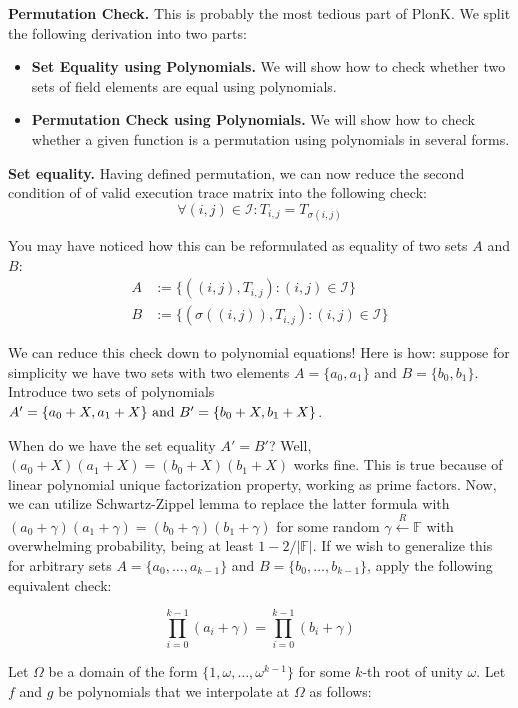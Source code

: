 \documentclass[../lecture-notes.tex]{subfiles}
\begin{document}
\textcolor{green!60!black}{\textbf{Permutation Check.}} This is probably the most
tedious part of PlonK. We split the following derivation into two parts:
\begin{itemize}
    \item \textbf{Set Equality using Polynomials.} We will show how to check
    whether two sets of field elements are equal using polynomials.
    \item \textbf{Permutation Check using Polynomials.} We will show how to
    check whether a given function is a permutation using polynomials in several 
    forms.
\end{itemize}

\textbf{Set equality.} Having defined permutation, we can now reduce the second
condition of  of valid execution trace matrix into
the following check:
\[\forall (i, j) \in \mathcal{I}: T_{i,j} = T_{\sigma(i,j)}\]

You may have noticed how this can be reformulated as equality of two sets $A$ and $B$:
\begin{align*}
    A &:= \{((i, j), T_{i,j}) : (i, j) \in \mathcal{I}\} \\
    B &:= \{(\sigma((i, j)), T_{i,j}) : (i, j) \in \mathcal{I}\}
\end{align*}

We can reduce this check down to polynomial equations! Here is how: suppose for
simplicity we have two sets with two elements \(A = \{a_0, a_1\}\) and \(B =
\{b_0, b_1\}\). Introduce two sets of polynomials \(A' = \{a_0 + X, a_1 +
X\}$ and $B' = \{b_0 + X, b_1 + X\}\). 

When do we have the set equality \(A' = B'\)? Well, \((a_0 + X)(a_1 + X) = (b_0
+ X)(b_1 + X)\) works fine. This is true because of linear polynomial unique
factorization property, working as prime factors. Now, we can utilize
Schwartz-Zippel lemma to replace the latter formula with \((a_0 + \gamma)(a_1 +
\gamma) = (b_0 + \gamma)(b_1 + \gamma)\) for some random $\gamma \xleftarrow{R}
\mathbb{F}$ with overwhelming probability, being at least $1-2/|\mathbb{F}|$. If we
wish to generalize this for arbitrary sets \(A = \{a_0, \ldots, a_{k-1}\}\) and
\(B = \{b_0, \ldots, b_{k-1}\}\), apply the following equivalent check:

\[\prod_{i=0}^{k-1} (a_i + \gamma) = \prod_{i=0}^{k-1} (b_i + \gamma)\]

Let $\Omega$ be a domain of the form \(\{1, \omega, \dots, \omega^{k-1}\}\) for
some $k$-th root of unity $\omega$. Let $f$ and $g$ be polynomials that we
interpolate at $\Omega$ as follows:
\end{document}
